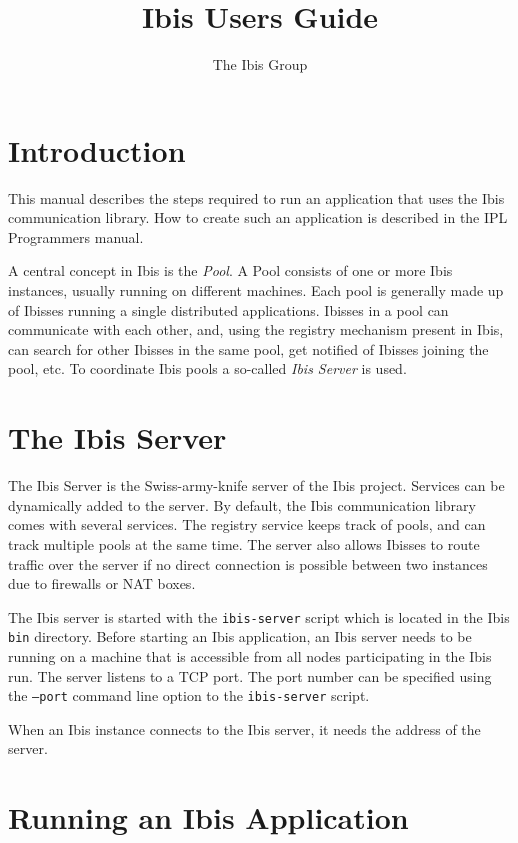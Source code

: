 \documentclass[10pt]{article}
\begin{document}
\title{Ibis Users Guide}

\author{The Ibis Group}

\maketitle

\section{Introduction}

This manual describes the steps required to run an application that uses
 the Ibis communication library. How to create such an application
is described in the IPL Programmers manual.

A central concept in Ibis is the \emph{Pool}. A Pool consists of one or
more Ibis instances, usually running on different machines. Each pool is
generally made up of Ibisses running a single distributed applications.
Ibisses in a pool can communicate with each other, and, using the
registry mechanism present in Ibis, can search for other Ibisses in the
same pool, get notified of Ibisses joining the pool, etc. To
coordinate Ibis pools a so-called \emph{Ibis Server} is used.

\section{The Ibis Server}

The Ibis Server is the Swiss-army-knife server of the Ibis project.
Services can be dynamically added to the server. By default, the Ibis
communication library comes with several services. The registry service
keeps track of pools, and can track multiple pools at the same time.
The server also allows Ibisses to route traffic over the server if no
direct connection is possible between two instances due to firewalls or
NAT boxes.

The Ibis server is started with the \texttt{ibis-server} script which is
located in the Ibis \texttt{bin} directory.  Before starting an Ibis
application, an Ibis server needs to be running on a machine that is
accessible from all nodes participating in the Ibis run. The server
listens to a TCP port. The port number can be specified using the
\texttt{--port} command line option to the \texttt{ibis-server} script.

When an Ibis instance connects to the Ibis server, it needs the address of the server. 


\section{Running an Ibis Application}
\end{document}
